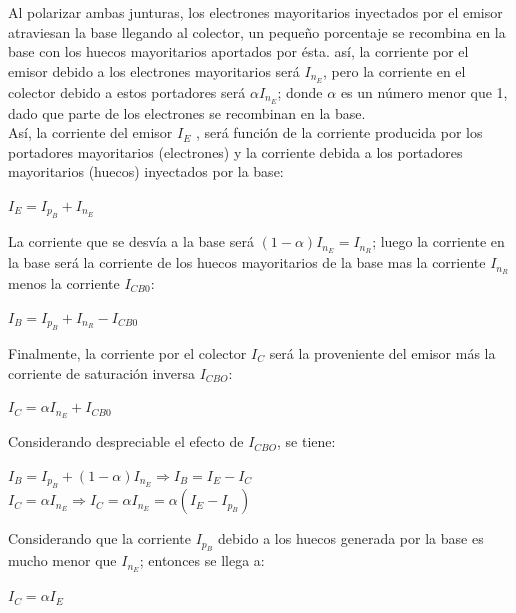 \documentclass[oneside]{book}
\numberwithin{equation}{section}
\numberwithin{figure}{section}
\numberwithin{table}{section}
\begin{document}
			Al polarizar ambas junturas, los electrones mayoritarios inyectados por el emisor atraviesan la base llegando al colector, un pequeño porcentaje se recombina en la base con los huecos mayoritarios aportados por ésta. así, la corriente por el emisor debido a los electrones mayoritarios será $I_{n_E}$, pero la corriente en el colector debido a estos portadores será $\alpha I_{n_E}$; donde $\alpha$ es un número menor que 1, dado que parte de los electrones se recombinan en la base.\\
		
			Así, la corriente del emisor $I_E$ , será función de la corriente producida por los portadores mayoritarios (electrones) y la corriente debida a los portadores mayoritarios (huecos) inyectados por la base: 
		
			\begin{center}
				$I_E=I_{p_B}+I_{n_E}$
			\end{center}
		
			La corriente que se desvía a la base será $(1-\alpha)I_{n_E}=I_{n_R}$; luego la corriente en la base será la corriente de los huecos mayoritarios de la base mas la corriente $I_{n_R}$ menos la corriente $I_{CB0}$:
		
			\begin{center}
				$I_B=I_{p_B}+I_{n_R}-I_{CB0}$
			\end{center}
		
			Finalmente, la corriente por el colector $I_C$ será la proveniente del emisor más la corriente de saturación inversa $I_{CBO}$:
			
			\begin{center}
					$I_C=\alpha I_{n_E}+I_{CB0}$
			\end{center}
			
			Considerando despreciable el efecto de $I_{CBO}$, se tiene:
			
			\begin{center}
				$I_B=I_{p_B}+(1-\alpha)I_{n_E} \Rightarrow I_B=I_E-I_C$\\
				$I_C=\alpha I_{n_E} \Rightarrow I_C=\alpha I_{n_E}=\alpha(I_E-I_{p_B})$	
			\end{center}
			
			Considerando que la corriente $I_{p_B}$ debido a los huecos generada por la base es mucho menor que $I_{n_E}$; entonces se llega a:
			
			\begin{center}
				$I_C=\alpha I_E$
			\end{center}
		
\end{document}
